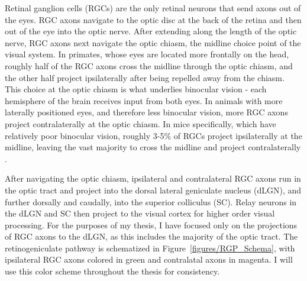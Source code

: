 Retinal ganglion cells (RGCs) are the only retinal neurons that send axons out of the eyes.
RGC axons navigate to the optic disc at the back of the retina and then out of the eye into the optic nerve.
After extending along the length of the optic nerve, RGC axons next navigate the optic chiasm, the midline choice point of the visual system.
In primates, whose eyes are located more frontally on the head, roughly half of the RGC axons cross the midline through the optic chiasm, and the other half project ipsilaterally after being repelled away from the chiasm.
This choice at the optic chiasm is what underlies binocular vision - each hemisphere of the brain receives input from both eyes.
In animals with more laterally positioned eyes, and therefore less binocular vision, more RGC axons project contralaterally at the optic chiasm.
In mice specifically, which have relatively poor binocular vision, roughly 3-5\% of RGCs project ipsilaterally at the midline, leaving the vast majority to cross the midline and project contralaterally \cite{petros2008retinal}.

After navigating the optic chiasm, ipsilateral and contralateral RGC axons run in the optic tract and project into the dorsal lateral geniculate nucleus (dLGN), and further dorsally and caudally, into the superior colliculus (SC).
Relay neurons in the dLGN and SC then project to the visual cortex for higher order visual processing.
For the purposes of my thesis, I have focused only on the projections of RGC axons to the dLGN, as this includes the majority of the optic tract.
The retinogeniculate pathway is schematized in Figure~\ref{figures/RGP_Schema}, with ipsilateral RGC axons colored in green and contralatal axons in magenta.
I will use this color scheme throughout the thesis for consistency.

